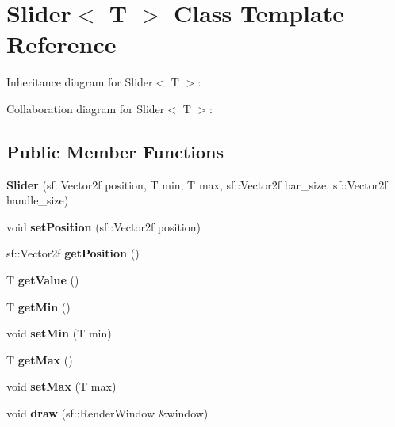 \hypertarget{classSlider}{}\section{Slider$<$ T $>$ Class Template Reference}
\label{classSlider}


Inheritance diagram for Slider$<$ T $>$\+:


Collaboration diagram for Slider$<$ T $>$\+:
\subsection*{Public Member Functions}
\begin{DoxyCompactItemize}
\item 
\mbox{\label{classSlider_a8ca210f84af7ad849ce69ea20882dbe3}} 
{\bfseries Slider} (sf\+::\+Vector2f position, T min, T max, sf\+::\+Vector2f bar\+\_\+size, sf\+::\+Vector2f handle\+\_\+size)
\item 
\mbox{\label{classSlider_a0816ac46159db7ad04abe8cf98e0d04d}} 
void {\bfseries set\+Position} (sf\+::\+Vector2f position)
\item 
\mbox{\label{classSlider_a04a59072c33674b915ae8afbf7068217}} 
sf\+::\+Vector2f {\bfseries get\+Position} ()
\item 
\mbox{\label{classSlider_af171a19e82f5030337cc660671404b3b}} 
T {\bfseries get\+Value} ()
\item 
\mbox{\label{classSlider_a17217ab754bf4da82e696e2f1a0ae2a4}} 
T {\bfseries get\+Min} ()
\item 
\mbox{\label{classSlider_a85fa2daf1512dc54a4c9d01b2d6599cc}} 
void {\bfseries set\+Min} (T min)
\item 
\mbox{\label{classSlider_a010499451cb4311b8ad4e2473e9a1024}} 
T {\bfseries get\+Max} ()
\item 
\mbox{\label{classSlider_a80135bcca568dde44a61e35160aa85c9}} 
void {\bfseries set\+Max} (T max)
\item 
\mbox{\label{classSlider_ad2598759e4d9af7dda469bf9643aa988}} 
void {\bfseries draw} (sf\+::\+Render\+Window \&window)
\end{DoxyCompactItemize}
